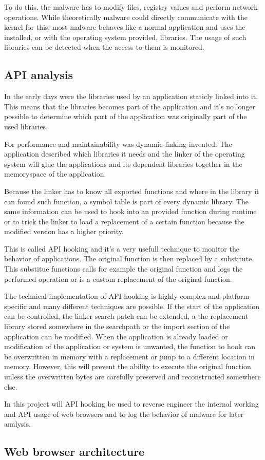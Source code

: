 To do this, the malware has to modify files, registry values  and perform network operations. While theoretically malware could directly communicate with the kernel for this, most malware behaves like a normal application and uses the installed, or with the operating system provided, libraries. The usage of such libraries can be detected when the access to them is monitored.

\subsection{API analysis}

In the early days were the libraries used by an application staticly linked into it. This means that the libraries becomes part of the application and it's no longer possible to determine which part of the application was originally part of the used libraries.

For performance and maintainability was dynamic linking invented. The application described which libraries it needs and the linker of the operating system will glue the applications and its dependent libraries together in the memoryspace of the application. 

Because the linker has to know all exported functions and where in the library it can found such function, a symbol table is part of every dynamic library. The same information can be used to hook into an provided function during runtime or to trick the linker to load a replacement of a certain function because the modified version has a higher priority.

This is called API hooking\cite{} and it's a very usefull technique to monitor the behavior of applications. The original function is then replaced by a substitute. This substitue functions calls for example the original function and logs the performed operation or is a custom replacement of the original function.

The technical implementation of API hooking is highly complex and platform specific and many different techniques\cite{http://jbremer.org/x86-api-hooking-demystified/} are possible. If the start of the application can be controlled, the linker search patch can be extended, a the replacement library stored somewhere in the searchpath or the import section of the application can be modified. When the application is already loaded or modification of the application or system is unwanted, the function to hook can be overwritten in memory with a replacement or jump to a different location in memory. However, this will prevent the ability to execute the original function unless the overwritten bytes are carefully preserved and reconstructed somewhere else.

In this project will API hooking be used to reverse engineer the internal working and API usage of web browsers and to log the behavior of malware for later analysis.

\subsection{Web browser architecture}

